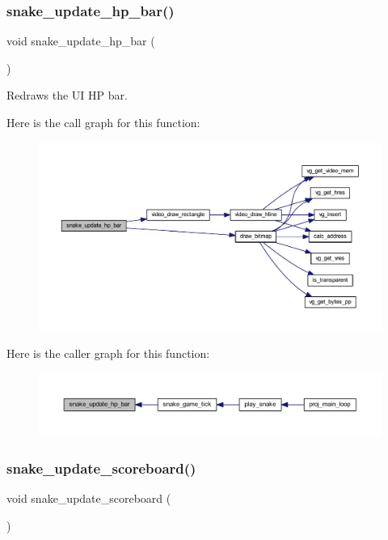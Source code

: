 \subsubsection{\texorpdfstring{snake\+\_\+update\+\_\+hp\+\_\+bar()}{snake\_update\_hp\_bar()}}
{\footnotesize\ttfamily void snake\+\_\+update\+\_\+hp\+\_\+bar (\begin{DoxyParamCaption}{ }\end{DoxyParamCaption})}



Redraws the UI HP bar. 

Here is the call graph for this function\+:\nopagebreak
\begin{figure}[H]
\begin{center}
\leavevmode
\includegraphics[width=350pt]{group__snake_ga51b55e1ad05667d456ed81db42c26b9f_cgraph}
\end{center}
\end{figure}
Here is the caller graph for this function\+:\nopagebreak
\begin{figure}[H]
\begin{center}
\leavevmode
\includegraphics[width=350pt]{group__snake_ga51b55e1ad05667d456ed81db42c26b9f_icgraph}
\end{center}
\end{figure}
\mbox{\label{group__snake_ga62eda6f8af6d324996f0a633f543e45f}} 
\subsubsection{\texorpdfstring{snake\+\_\+update\+\_\+scoreboard()}{snake\_update\_scoreboard()}}
{\footnotesize\ttfamily void snake\+\_\+update\+\_\+scoreboard (\begin{DoxyParamCaption}{ }\end{DoxyParamCaption})}



